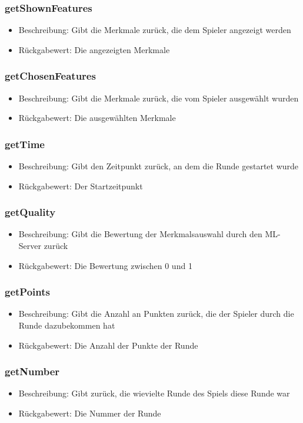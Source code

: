 \documentclass[a4paper]{scrreprt}
\begin{document}
	\subsubsection{getShownFeatures}
	\begin{itemize}
		\item Beschreibung: Gibt die Merkmale zurück, die dem Spieler angezeigt werden
		\item Rückgabewert: Die angezeigten Merkmale
	\end{itemize}
	\subsubsection{getChosenFeatures}
	\begin{itemize}
		\item Beschreibung: Gibt die Merkmale zurück, die vom Spieler ausgewählt wurden
		\item Rückgabewert: Die ausgewählten Merkmale
	\end{itemize}
	\subsubsection{getTime}
	\begin{itemize}
		\item Beschreibung: Gibt den Zeitpunkt zurück, an dem die Runde gestartet wurde
		\item Rückgabewert: Der Startzeitpunkt 
	\end{itemize}
	\subsubsection{getQuality}
	\begin{itemize}
		\item Beschreibung: Gibt die Bewertung der Merkmalsauswahl durch den ML-Server zurück
		\item Rückgabewert: Die Bewertung zwischen 0 und 1
	\end{itemize}
	\subsubsection{getPoints}
	\begin{itemize}
		\item Beschreibung: Gibt die Anzahl an Punkten zurück, die der Spieler durch die Runde dazubekommen hat
		\item Rückgabewert: Die Anzahl der Punkte der Runde
	\end{itemize}
	\subsubsection{getNumber}
	\begin{itemize}
		\item Beschreibung: Gibt zurück, die wievielte Runde des Spiels diese Runde war
		\item Rückgabewert: Die Nummer der Runde
	\end{itemize}
\end{document}
